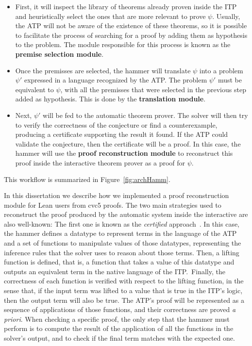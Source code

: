 \begin{itemize}
  \item First, it will inspect the library of theorems already proven inside the ITP
        and heuristically select the ones that are more relevant to prove $\psi$.
        Usually, the ATP will not be aware of the existence of these theorems, so it is
        possible to facilitate the process of searching for a proof by adding them as
        hypothesis to the problem. The module responsible for this process is known as the
        \textbf{premise selection module}.\@
  \item Once the premisses are selected, the hammer will translate $\psi$ into a problem
        $\psi'$ expressed in a language recognized by the ATP. The problem $\psi'$ must
        be equivalent to $\psi$, with all the premisses that were selected in the previous step
        added as hypothesis. This is done by the \textbf{translation module}.\@
  \item Next, $\psi'$ will be fed to the automatic theorem prover. The solver will then try to
        verify the correctness of the conjecture or find a counterexample, producing a
        certificate supporting the result it found.
        If the ATP could validate the conjecture, then the
        certificate will be a proof. In this case, the hammer will use the
        \textbf{proof reconstruction module} to reconstruct this proof inside
        the interactive theorem prover as a proof for $\psi$.

\end{itemize}

This workflow is summarized in Figure~\ref{fig:archHamm}.

In this dissertation we describe how we implemented a proof reconstruction module
for Lean users from cvc5 proofs.
The two main strategies used to reconstruct the proof produced
by the automatic system inside the interactive are also well-known:
The first one is known as the \textit{certified} approach~\cite{snipe}. In this case,
the hammer defines a datatype to represent
terms in the language of the ATP and a set of functions to manipulate
values of those datatypes, representing
the inference rules that the solver uses to reason about those terms. Then, a lifting function is defined, that is,
a function that takes a value of this datatype and outputs an equivalent term in the native
language of the ITP.\ Finally, the correctness of each function is
verified with respect to the lifting function, in the sense that, if the input term
was lifted to a value that is true in the ITP's logic, then the output term will
also be true. The ATP's proof will be represented as a sequence of applications of those
functions, and their correctness are proved \textit{a priori}. When checking
a specific proof, the only step that the hammer must perform is to compute the result
of the application of all the functions in the solver's output, and to check if
the final term matches with the expected one.

